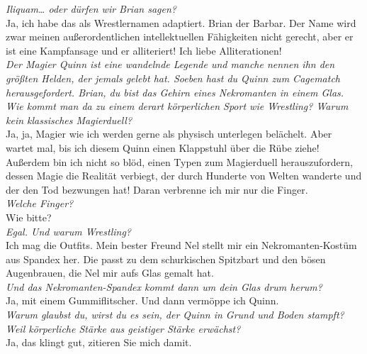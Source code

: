 \documentclass[final]{multiversum}
\begin{document}
\textit{Iliquam… oder dürfen wir Brian sagen?}\\
Ja, ich habe das als Wrestlernamen adaptiert. Brian der Barbar. Der Name wird zwar meinen außerordentlichen intellektuellen Fähigkeiten nicht gerecht, aber er ist eine Kampfansage und er alliteriert! Ich liebe Alliterationen! \\
\textit{Der Magier Quinn ist eine wandelnde Legende und manche nennen ihn den größten Helden, der jemals gelebt hat. Soeben hast du Quinn zum Cagematch herausgefordert. Brian, du bist das Gehirn eines Nekromanten in einem Glas. Wie kommt man da zu einem derart körperlichen Sport wie Wrestling?  Warum kein klassisches Magierduell?}\\
Ja, ja, Magier wie ich werden gerne als physisch unterlegen belächelt. Aber wartet mal, bis ich diesem Quinn einen Klappstuhl über die Rübe ziehe! Außerdem bin ich  nicht so blöd, einen Typen zum Magierduell herauszufordern, dessen Magie die Realität verbiegt, der durch Hunderte von Welten wanderte und der den Tod bezwungen hat! Daran verbrenne ich mir nur die Finger.\\
\textit{Welche Finger?}\\
Wie bitte?\\
\textit{Egal. Und warum Wrestling?}\\
Ich mag die Outfits. Mein bester Freund Nel stellt mir ein Nekromanten-Kostüm aus Spandex her. Die passt zu dem schurkischen Spitzbart und den bösen Augenbrauen, die Nel mir aufs Glas gemalt hat.\\
\textit{Und das Nekromanten-Spandex kommt dann um dein Glas drum herum?}\\
Ja, mit einem Gummiflitscher. Und dann vermöppe ich Quinn. \\
\textit{Warum glaubst du, wirst du es sein, der Quinn in Grund und Boden stampft? Weil körperliche Stärke aus geistiger Stärke erwächst?}\\
Ja, das klingt gut, zitieren Sie mich damit.
\end{document}
